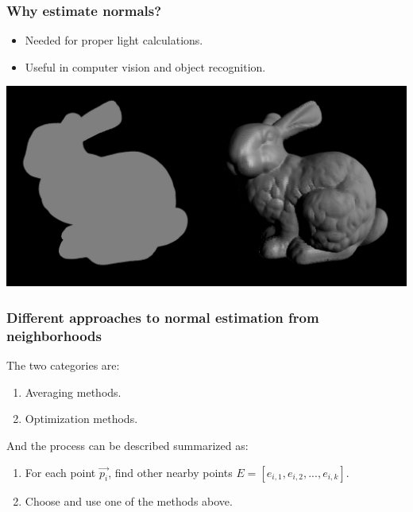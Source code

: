 \documentclass[11pt]{article}
\begin{document}
\subsubsection*{Why estimate normals?}
\label{sec:org2b5ff82}
\begin{itemize}
\item Needed for proper light calculations.
\item Useful in computer vision and object recognition.
\end{itemize}

\begin{center}
\includegraphics[width=.9\linewidth]{./images/Presentation_nonormals_normals.png}
\end{center}



\subsubsection*{Different approaches to normal estimation from neighborhoods}
\label{sec:org12bbb8b}
The two categories are:
\begin{enumerate}
\item Averaging methods.
\item Optimization methods.
\end{enumerate}

And the process can be described summarized as:
\begin{enumerate}
\item For each point \(\vec{p_i}\), find other nearby points \(E=[e_{i,1},e_{i,2},...,e_{i,k}]\).
\item Choose and use one of the methods above.
\end{enumerate}
\end{document}
